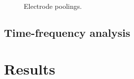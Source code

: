 \documentclass[defaultstyle,12pt]{article}
\begin{document}
\begin{figure}[h]
\begin{tabular}{ll}
\end{tabular}
\caption{Electrode poolings.}{}
\label{fig:channels}
\end{figure}

\subsection{Time-frequency analysis}

\section{Results}



\end{document}
